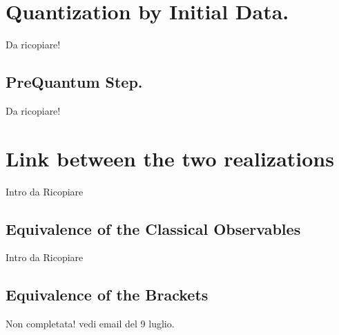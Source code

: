 \documentclass[Main]{subfiles}
\begin{document}
\section{Quantization by Initial Data.}
		\begin{Warning}
			Da ricopiare!
		\end{Warning}
	\subsection{PreQuantum Step.}
		\begin{Warning}
			Da ricopiare!
		\end{Warning}		
		
\section{Link between the two realizations}	
		\begin{Warning}
			Intro da Ricopiare
		\end{Warning}
	
	\subsection{Equivalence of the Classical Observables}	
		\begin{Warning}
			Intro da Ricopiare
		\end{Warning}
	\subsection{Equivalence of the Brackets}	
		\begin{Warning}
			Non completata! vedi email del 9 luglio.
		\end{Warning}
\end{document}
